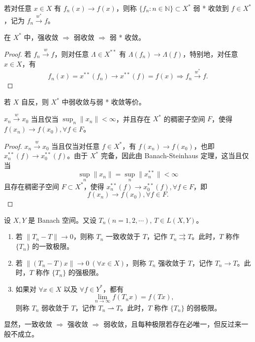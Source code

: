 \documentclass[lang=cn,newtx,10pt,scheme=chinese,thmcnt=chapter]{elegantbook}
\begin{document}
\begin{definition}[弱 * 收敛]
若对任意 $x \in X$ 有 $f_n(x) \rightarrow f(x)$，则称 $\{f_n: n \in \mathbb{N}\} \subset X^*$ 弱 * 收敛到 $f \in X^*$，记为 $f_n \xrightarrow{w^*} f$。
\end{definition}

\begin{proposition}[三种收敛性的关系]
在 $X^*$ 中，强收敛 $\Rightarrow$ 弱收敛 $\Rightarrow$ 弱 * 收敛。
\end{proposition}

\begin{proof}
若 $f_n \xrightarrow{w} f$，则对任意 $\Lambda \in X^{**}$ 有 $\Lambda(f_n) \rightarrow \Lambda(f)$，特别地，对任意 $x \in X$，有
\[
f_n(x) = x^{**}(f_n) \rightarrow x^{**}(f) = f(x) \Rightarrow f_n \xrightarrow{w^*} f.
\]
\end{proof}

\begin{proposition}[自反空间中的收敛等价性]
若 $X$ 自反，则 $X^*$ 中弱收敛与弱 * 收敛等价。
\end{proposition}

\begin{theorem}[弱收敛的等价刻画]
$x_n \xrightarrow{w} x_0$ 当且仅当 $\sup_n \|x_n\| < \infty$，并且存在 $X^*$ 的稠密子空间 $F$，使得 $f(x_n) \rightarrow f(x_0), \forall f \in F$。
\end{theorem}

\begin{proof}
$x_n \xrightarrow{w} x_0$ 当且仅当对任意 $f \in X^*$，有 $f(x_n) \rightarrow f(x_0)$，也即 $x_n^{**}(f) \rightarrow x_0^{**}(f)$。由于 $X^*$ 完备，因此由 Banach-Steinhaus 定理，这当且仅当
\[
\sup_n \|x_n\| = \sup_n \|x_n^{**}\| < \infty
\]
且存在稠密子空间 $F \subset X^*$，使得 $x_n^{**}(f) \rightarrow x_0^{**}(f), \forall f \in F$，即
\[
f(x_n) \rightarrow f(x_0), \forall f \in F.
\]
\end{proof}

\begin{definition}
设 $X , Y$ 是 Banach 空间。又设 $T_n (n=1,2,\cdots)$, $T \in L(X, Y)$。
\begin{enumerate}
    \item 若 $\|T_n - T\| \to 0$，则称 $T_n$ 一致收敛于 $T$，记作 $T_n \rightrightarrows T$。此时，$T$ 称作 $\{T_n\}$ 的一致极限。
    \item 若 $\|(T_n - T)x\| \to 0 \ (\forall x \in X)$，则称 $T_n$ 强收敛于 $T$，记作 $T_n \to T$。此时，$T$ 称作 $\{T_n\}$ 的强极限。
    \item 如果对 $\forall x \in X$ 以及 $\forall f \in Y^*$，都有
    \[
    \lim_{n \to \infty} f(T_n x) = f(T x),
    \]
    则称 $T_n$ 弱收敛于 $T$，记作 $T_n \rightharpoonup T$。此时，$T$ 称作 $\{T_n\}$ 的弱极限。
\end{enumerate}
显然，一致收敛 $\Rightarrow$ 强收敛 $\Rightarrow$ 弱收敛，且每种极限若存在必唯一，但反过来一般不成立。
\end{definition}
\end{document}
